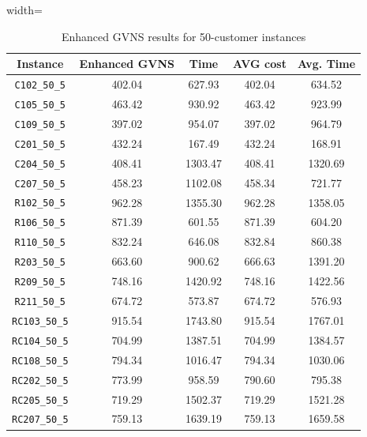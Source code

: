 \documentclass{article}
\begin{document}
\begin{table}[h]
\centering
\small
\setlength{\tabcolsep}{4pt}
\caption{Enhanced GVNS results for 50-customer instances}
\vspace{4mm}
\begin{adjustbox}{width=\textwidth}
\begin{tabular}{c c c c c}
\toprule
Instance & Enhanced GVNS & Time & AVG cost & Avg. Time \\
\midrule
\texttt{C102\_50\_5} & 402.04 & 627.93 & 402.04 & 634.52 \\
\texttt{C105\_50\_5} & 463.42 & 930.92 & 463.42 & 923.99 \\
\texttt{C109\_50\_5} & 397.02 & 954.07 & 397.02 & 964.79 \\
\texttt{C201\_50\_5} & 432.24 & 167.49 & 432.24 & 168.91 \\
\texttt{C204\_50\_5} & 408.41 & 1303.47 & 408.41 & 1320.69 \\
\texttt{C207\_50\_5} & 458.23 & 1102.08 & 458.34 & 721.77 \\
\texttt{R102\_50\_5} & 962.28 & 1355.30 & 962.28 & 1358.05 \\
\texttt{R106\_50\_5} & 871.39 & 601.55 & 871.39 & 604.20 \\
\texttt{R110\_50\_5} & 832.24 & 646.08 & 832.84 & 860.38 \\
\texttt{R203\_50\_5} & 663.60 & 900.62 & 666.63 & 1391.20 \\
\texttt{R209\_50\_5} & 748.16 & 1420.92 & 748.16 & 1422.56 \\
\texttt{R211\_50\_5} & 674.72 & 573.87 & 674.72 & 576.93 \\
\texttt{RC103\_50\_5} & 915.54 & 1743.80 & 915.54 & 1767.01 \\
\texttt{RC104\_50\_5} & 704.99 & 1387.51 & 704.99 & 1384.57 \\
\texttt{RC108\_50\_5} & 794.34 & 1016.47 & 794.34 & 1030.06 \\
\texttt{RC202\_50\_5} & 773.99 & 958.59 & 790.60 & 795.38 \\
\texttt{RC205\_50\_5} & 719.29 & 1502.37 & 719.29 & 1521.28 \\
\texttt{RC207\_50\_5} & 759.13 & 1639.19 & 759.13 & 1659.58 \\
\bottomrule
\end{tabular}
\end{adjustbox}
\end{table}
\end{document}
